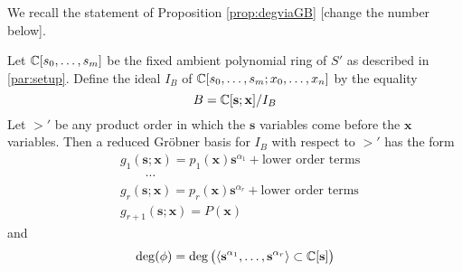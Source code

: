 \documentclass[fleqn,reqno]{amsart}
\numberwithin{first}{chapter}
\begin{document}
\begin{paragraf*}
We recall the statement of Proposition \ref{prop:degviaGB} [change the number below].
\end{paragraf*}

\begin{proposition}
Let $\mathbb{C}[s_0,\ldots,s_m]$ be the fixed ambient polynomial ring of $S'$ as described in \ref{par:setup}.
Define the ideal $I_B$ of $\mathbb{C}[s_0,\ldots,s_m;x_0,\ldots,x_n]$ by the equality
\[
	B=\mathbb{C}[\mathbf s;\mathbf x]/I_B
\]
Let $>'$ be any product order in which the $\mathbf s$ variables
come before the $\mathbf x$ variables.
Then a reduced Gr\"obner basis for $I_B$ with respect to $>'$ has the form
\begin{align*}
	&g_1(\mathbf s;\mathbf x)=p_1(\mathbf x){\mathbf s}^{\alpha_1}+\text{lower order terms}\\
	&\qquad\cdots\\
	&g_r(\mathbf s;\mathbf x)=p_r(\mathbf x){\mathbf s}^{\alpha_r}+\text{lower order terms}\\
	&g_{r+1}(\mathbf s;\mathbf x)=P(\mathbf x)
\end{align*}
and
\[
	\deg(\phi)=\deg \big(\langle{\mathbf s}^{\alpha_1},\ldots,{\mathbf s}^{\alpha_r}\rangle\subset\mathbb{C}[\mathbf s]\big)
\]
\end{proposition}
\end{document}
